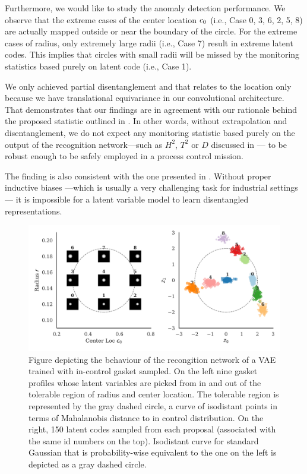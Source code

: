 \documentclass[journal, peerreview]{IEEEtran}
\begin{document}
Furthermore, we would like to study the anomaly detection performance. We observe that the extreme cases of the center location $c_{0}$ (i.e., Case 0, 3, 6, 2, 5, 8) are actually mapped outside or near the boundary of the circle. For the extreme cases of radius, only extremely large radii  (i.e., Case 7) result in extreme latent codes. This implies that circles with small radii will be missed by the monitoring statistics based purely on latent code (i.e., Case 1).

We only achieved partial disentanglement and that relates to the location only because we have translational equivariance in our convolutional architecture.
That demonstrates that our findings are in agreement with our rationale behind the proposed statistic outlined in .
In other words, without extrapolation and disentanglement, we do not expect any monitoring statistic based purely on the output of the recognition network---such as $H^{2}$, $T^{2}$ or $D$ discussed in --- to be robust enough to be safely employed in a process control mission.

The finding is also consistent with the one presented in \cite[Thm. 1]{locatello2018challenging}.
Without proper inductive biases ---which is usually a very challenging task for industrial settings--- it is impossible for a latent variable model to learn disentangled representations. 

\begin{figure}[t]
    \centering
    \includegraphics[width=\linewidth]{figs/proposals.pdf}
    \caption{Figure depicting the behaviour of the recongition network of a VAE trained with in-control gasket sampled. On the left nine gasket profiles whose latent variables are picked from in and out of the tolerable region of radius and center location. The tolerable region is represented by the gray dashed circle, a curve of isodistant points in terms of Mahalanobis distance to in control distribution. On the right, 150 latent codes sampled from each proposal (associated with the same id numbers on the top).  Isodistant curve for standard Gaussian that is probability-wise equivalent to the one on the left is depicted as a gray dashed circle.}
    \label{fig:proposals}
\end{figure}
\end{document}
